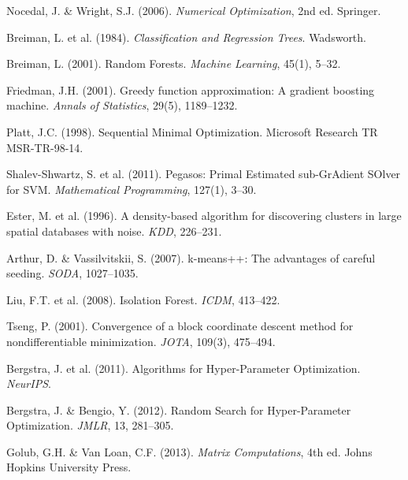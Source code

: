 \documentclass[11pt,a4paper]{article}
\theoremstyle{definition}
\theoremstyle{remark}
\begin{document}
\begin{enumerate}[label={[\arabic*]}, itemsep=2pt]
\item Nocedal, J. \& Wright, S.J. (2006). \textit{Numerical Optimization}, 2nd ed. Springer.
\item Breiman, L. et al. (1984). \textit{Classification and Regression Trees}. Wadsworth.
\item Breiman, L. (2001). Random Forests. \textit{Machine Learning}, 45(1), 5--32.
\item Friedman, J.H. (2001). Greedy function approximation: A gradient boosting machine. \textit{Annals of Statistics}, 29(5), 1189--1232.
\item Platt, J.C. (1998). Sequential Minimal Optimization. Microsoft Research TR MSR-TR-98-14.
\item Shalev-Shwartz, S. et al. (2011). Pegasos: Primal Estimated sub-GrAdient SOlver for SVM. \textit{Mathematical Programming}, 127(1), 3--30.
\item Ester, M. et al. (1996). A density-based algorithm for discovering clusters in large spatial databases with noise. \textit{KDD}, 226--231.
\item Arthur, D. \& Vassilvitskii, S. (2007). k-means++: The advantages of careful seeding. \textit{SODA}, 1027--1035.
\item Liu, F.T. et al. (2008). Isolation Forest. \textit{ICDM}, 413--422.
\item Tseng, P. (2001). Convergence of a block coordinate descent method for nondifferentiable minimization. \textit{JOTA}, 109(3), 475--494.
\item Bergstra, J. et al. (2011). Algorithms for Hyper-Parameter Optimization. \textit{NeurIPS}.
\item Bergstra, J. \& Bengio, Y. (2012). Random Search for Hyper-Parameter Optimization. \textit{JMLR}, 13, 281--305.
\item Golub, G.H. \& Van Loan, C.F. (2013). \textit{Matrix Computations}, 4th ed. Johns Hopkins University Press.
\end{enumerate}
\end{document}
